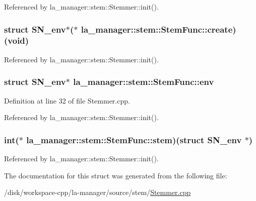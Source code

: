 Referenced by la\_\-manager::stem::Stemmer::init().\hypertarget{structla__manager_1_1stem_1_1StemFunc_3b0193fb82ca7e362bee161c2eff6dc4}{
\subsubsection[{create}]{\setlength{\rightskip}{0pt plus 5cm}struct {\bf SN\_\-env}$\ast$($\ast$ {\bf la\_\-manager::stem::StemFunc::create})(void)}}
\label{structla__manager_1_1stem_1_1StemFunc_3b0193fb82ca7e362bee161c2eff6dc4}




Referenced by la\_\-manager::stem::Stemmer::init().\hypertarget{structla__manager_1_1stem_1_1StemFunc_8dfdd0f1367426d19410226cd6d89c6d}{
\subsubsection[{env}]{\setlength{\rightskip}{0pt plus 5cm}struct {\bf SN\_\-env}$\ast$ {\bf la\_\-manager::stem::StemFunc::env}}}
\label{structla__manager_1_1stem_1_1StemFunc_8dfdd0f1367426d19410226cd6d89c6d}




Definition at line 32 of file Stemmer.cpp.

Referenced by la\_\-manager::stem::Stemmer::init().\hypertarget{structla__manager_1_1stem_1_1StemFunc_18a1d0b5aba2b9f7aee822ad02eac0f2}{
\subsubsection[{stem}]{\setlength{\rightskip}{0pt plus 5cm}int($\ast$ {\bf la\_\-manager::stem::StemFunc::stem})(struct {\bf SN\_\-env} $\ast$)}}
\label{structla__manager_1_1stem_1_1StemFunc_18a1d0b5aba2b9f7aee822ad02eac0f2}




Referenced by la\_\-manager::stem::Stemmer::init().

The documentation for this struct was generated from the following file:\begin{CompactItemize}
\item 
/disk/workspace-cpp/la-manager/source/stem/\hyperlink{Stemmer_8cpp}{Stemmer.cpp}\end{CompactItemize}

